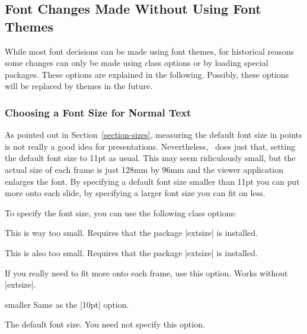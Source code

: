\subsection{Font Changes Made Without Using Font Themes}

While most font decisions can be made using font themes, for
historical reasons some changes can only be made using class
options or by loading special packages. These options are explained in
the following. Possibly, these options will be replaced by themes in
the future.


\subsubsection{Choosing a Font Size for Normal Text}

As pointed out in Section~\ref{section-sizes}, measuring the default
font size in points is not really a good idea for
presentations. Nevertheless, \beamer\ does just that, setting the
default font size to 11pt as usual. This may seem ridiculously small, but
the actual size of each frame is just 128mm by 96mm and the viewer
application enlarges the font. By specifying a default font size
smaller than 11pt you can put more onto each slide, by specifying a
larger font size you can fit on less.

To specify the font size, you can use the following class options:

\begin{classoption}{8pt}
  This is way too small. Requires that the package |extsize|
  is installed.
\end{classoption}

\begin{classoption}{9pt}
  This is also too small. Requires that the package |extsize|
  is installed.
\end{classoption}

\begin{classoption}{10pt}
  If you really need to fit more onto each frame, use this
  option. Works without |extsize|.
\end{classoption}

\begin{classoption}{smaller}
  Same as the |10pt| option.
\end{classoption}

\begin{classoption}{11pt}
  The default font size. You need not specify this option.
\end{classoption}

